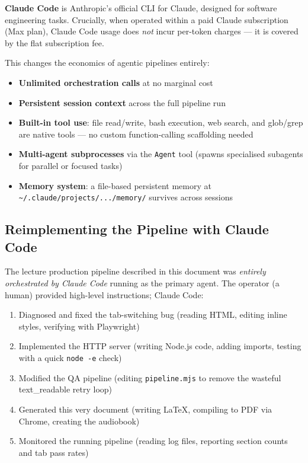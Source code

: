 \documentclass[12pt,a4paper]{article}
\begin{document}
\textbf{Claude Code} is Anthropic's official CLI for Claude, designed for
software engineering tasks. Crucially, when operated within a paid Claude
subscription (Max plan), Claude Code usage does \emph{not} incur per-token
charges --- it is covered by the flat subscription fee.

This changes the economics of agentic pipelines entirely:

\begin{itemize}[leftmargin=2em]
  \item \textbf{Unlimited orchestration calls} at no marginal cost
  \item \textbf{Persistent session context} across the full pipeline run
  \item \textbf{Built-in tool use}: file read/write, bash execution, web search,
        and glob/grep are native tools --- no custom function-calling scaffolding needed
  \item \textbf{Multi-agent subprocesses} via the \texttt{Agent} tool (spawns
        specialised subagents for parallel or focused tasks)
  \item \textbf{Memory system}: a file-based persistent memory at
        \texttt{\textasciitilde/.claude/projects/.../memory/} survives across sessions
\end{itemize}

\subsection{Reimplementing the Pipeline with Claude Code}

The lecture production pipeline described in this document was \emph{entirely
orchestrated by Claude Code} running as the primary agent. The operator
(a human) provided high-level instructions; Claude Code:

\begin{enumerate}[leftmargin=2em]
  \item Diagnosed and fixed the tab-switching bug (reading HTML, editing inline
        styles, verifying with Playwright)
  \item Implemented the HTTP server (writing Node.js code, adding imports,
        testing with a quick \texttt{node -e} check)
  \item Modified the QA pipeline (editing \texttt{pipeline.mjs} to remove the
        wasteful text\_readable retry loop)
  \item Generated this very document (writing LaTeX, compiling to PDF via Chrome,
        creating the audiobook)
  \item Monitored the running pipeline (reading log files, reporting section counts
        and tab pass rates)
\end{enumerate}
\end{document}
